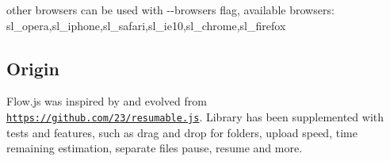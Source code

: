other browsers can be used with {\ttfamily -\/-\/browsers} flag, available browsers\+: sl\+\_\+opera,sl\+\_\+iphone,sl\+\_\+safari,sl\+\_\+ie10,sl\+\_\+chrome,sl\+\_\+firefox

\subsection*{Origin}

Flow.\+js was inspired by and evolved from \href{https://github.com/23/resumable.js}{\tt https\+://github.\+com/23/resumable.\+js}. Library has been supplemented with tests and features, such as drag and drop for folders, upload speed, time remaining estimation, separate files pause, resume and more. 